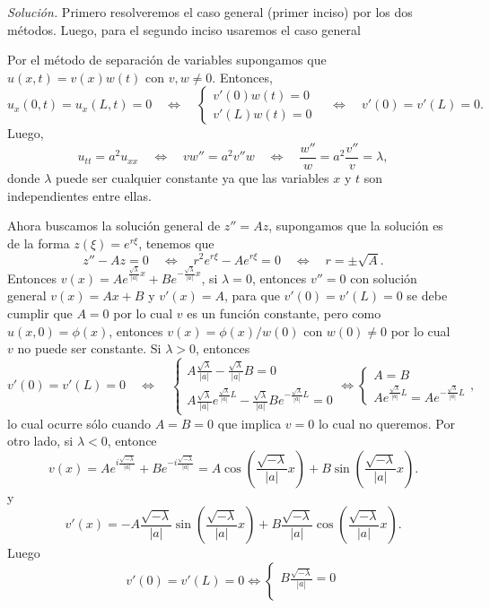 \documentclass[12pt]{article}
\newcommand{\sol}{\textit{Solución. }}
\newcommand{\pp}[1]{\left( #1 \right)}
\newcommand{\ssi}{\Longleftrightarrow}
\newcommand{\Ssi}{\quad\Longleftrightarrow\quad}
\renewcommand{\l}{\lambda}
\begin{document}
\begin{enumerate}
        \sol Primero resolveremos el caso general (primer inciso) por los dos métodos. Luego, para el segundo inciso usaremos el caso general

        Por el método de separación de variables supongamos que $u(x,t)=v(x)w(t)$ con $v, w\neq 0$. Entonces,
        \[ u_x(0,t)=u_x(L,t)=0\Ssi\begin{cases}
            v'(0)w(t)=0\\
            v'(L)w(t)=0
        \end{cases}\Ssi  v'(0)=v'(L)=0 . \]
        Luego,
        \[ u_{tt} = a^2 u_{xx} \Ssi vw''=a^2 v''w\Ssi\frac{w''}{w}=a^2\frac{v''}{v}=\l, \]
        donde $\l$ puede ser cualquier constante ya que las variables $x$ y $t$ son independientes entre ellas.

        Ahora buscamos la solución general de $z''=Az$, supongamos que la solución es de la forma $z(\xi)=e^{r\xi}$, tenemos que
        \[ z''-Az=0\Ssi r^2e^{r\xi}-Ae^{r\xi}=0\Ssi r=\pm\sqrt{A}. \]
        Entonces $v(x)=Ae^{\tfrac{\sqrt{\l}}{|a|}x}+Be^{-\tfrac{\sqrt{\l}}{|a|}x}$, si $\l=0$, entonces $v''=0$ con solución general $v(x)=Ax+B$ y $v'(x)=A$, para que $v'(0)=v'(L)=0$ se debe cumplir que $A=0$ por lo cual $v$ es un función constante, pero como $u(x,0)=\phi(x)$, entonces $v(x)=\phi(x)/w(0)$ con $w(0)\neq 0$ por lo cual $v$ no puede ser constante. Si $\l>0$, entonces
        \[ 
        v'(0)=v'(L)=0\Ssi \begin{cases}
            A\tfrac{\sqrt{\l}}{|a|}-\tfrac{\sqrt{\l}}{|a|} B=0\\
            A\tfrac{\sqrt{\l}}{|a|}e^{\tfrac{\sqrt{\l}}{|a|}L}-\tfrac{\sqrt{\l}}{|a|} Be^{-\tfrac{\sqrt{\l}}{|a|}L} =0
        \end{cases}
        \ssi
        \begin{cases}
            A=B\\
            Ae^{\tfrac{\sqrt{\l}}{|a|}L} =Ae^{-\tfrac{\sqrt{\l}}{|a|}L}
        \end{cases},
        \]
        lo cual ocurre sólo cuando $A=B=0$ que implica $v=0$ lo cual no queremos. Por otro lado, si $\l<0$, entonce
        \[ v(x) = Ae^{i\frac{\sqrt{-\l}}{|a|}} + Be^{-i\frac{\sqrt{-\l}}{|a|}} = A\cos\pp{\frac{\sqrt{-\l}}{|a|}x}+ B\sin\pp{\frac{\sqrt{-\l}}{|a|}x}. \]
        y
        \[ v'(x) =-A\frac{\sqrt{-\l}}{|a|}\sin\pp{\frac{\sqrt{-\l}}{|a|}x}+ B\frac{\sqrt{-\l}}{|a|}\cos\pp{\frac{\sqrt{-\l}}{|a|}x}. \]
        Luego
        \[ v'(0)=v'(L)=0\ssi \begin{cases}
             B\tfrac{\sqrt{-\l}}{|a|}=0\\

\end{cases}\]
\end{enumerate}
\end{document}
